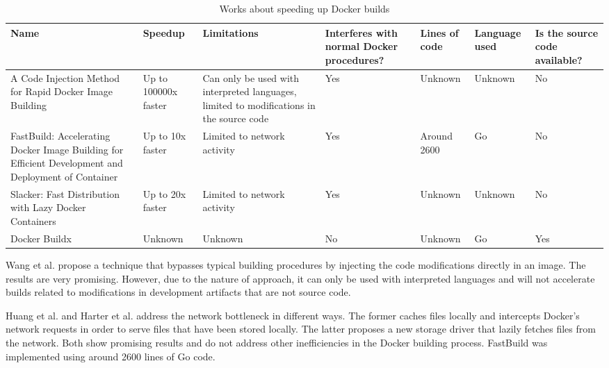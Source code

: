 \begin{table}[H]
    \centering
    \begin{tabular}{|p{}|p{}|p{}|p{}|p{}|p{}|p{}|}
        \hline \textbf{Name} & \textbf{Speedup} & \textbf{Limitations} & \textbf{Interferes with normal Docker procedures?} & \textbf{Lines of code} & \textbf{Language used} & \textbf{Is the source code available?} \\
        \hline A Code Injection Method for Rapid Docker Image Building \cite{wangCodeInjectionMethod2019} & Up to 100000x faster & Can only be used with interpreted languages, limited to modifications in the source code & Yes & Unknown & Unknown & No \\
        \hline FastBuild: Accelerating Docker Image Building for Efficient Development and Deployment of Container \cite{huangFastBuildAcceleratingDocker2019} & Up to 10x faster & Limited to network activity & Yes & Around 2600 & Go & No \\
        \hline Slacker: Fast Distribution with Lazy Docker Containers \cite{harterSlackerFastDistribution} & Up to 20x faster & Limited to network activity & Yes & Unknown & Unknown & No \\
        \hline Docker Buildx \footnotemark{} & Unknown & Unknown & No & Unknown & Go & Yes \\
        \hline
    \end{tabular}
    \caption{Works about speeding up Docker builds}
    \label{tab:works_speeding_up}
\end{table}



Wang et al. \cite{wangCodeInjectionMethod2019} propose a technique that bypasses typical building procedures by injecting the code modifications directly in an image. The results are very promising. However, due to the nature of approach, it can only be used with interpreted languages and will not accelerate builds related to modifications in development artifacts that are not source code.

Huang et al. \cite{huangFastBuildAcceleratingDocker2019} and Harter et al. \cite{harterSlackerFastDistribution} address the network bottleneck in different ways. The former caches files locally and intercepts Docker's network requests in order to serve files that have been stored locally. The latter proposes a new storage driver that lazily fetches files from the network. Both show promising results and do not address other inefficiencies in the Docker building process. FastBuild was implemented using around 2600 lines of Go code.

